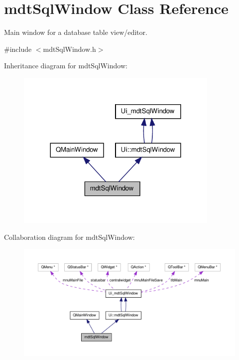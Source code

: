 \hypertarget{classmdt_sql_window}{\section{mdt\-Sql\-Window Class Reference}
\label{classmdt_sql_window}
}


Main window for a database table view/editor.  




{\ttfamily \#include $<$mdt\-Sql\-Window.\-h$>$}



Inheritance diagram for mdt\-Sql\-Window\-:
\nopagebreak
\begin{figure}[H]
\begin{center}
\leavevmode
\includegraphics[width=276pt]{classmdt_sql_window__inherit__graph}
\end{center}
\end{figure}


Collaboration diagram for mdt\-Sql\-Window\-:
\nopagebreak
\begin{figure}[H]
\begin{center}
\leavevmode
\includegraphics[width=350pt]{classmdt_sql_window__coll__graph}
\end{center}
\end{figure}

